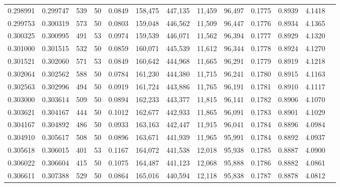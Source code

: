 \begin{tabular}{rrrrrrrrrrrrr}
0.298991 & 0.299747 &   539 &  50 &                                     0.0849 & 158,475 & 447,135 &  11,459 &  96,497 & 0.1775 & 0.8939 & 4.1418 \\
0.299753 & 0.300319 &   573 &  50 &                                     0.0803 & 159,048 & 446,562 &  11,509 &  96,447 & 0.1776 & 0.8934 & 4.1365 \\
0.300325 & 0.300995 &   491 &  53 &                                     0.0974 & 159,539 & 446,071 &  11,562 &  96,394 & 0.1777 & 0.8929 & 4.1320 \\
0.301000 & 0.301515 &   532 &  50 &                                     0.0859 & 160,071 & 445,539 &  11,612 &  96,344 & 0.1778 & 0.8924 & 4.1270 \\
0.301521 & 0.302060 &   571 &  53 &                                     0.0849 & 160,642 & 444,968 &  11,665 &  96,291 & 0.1779 & 0.8919 & 4.1218 \\
0.302064 & 0.302562 &   588 &  50 &                                     0.0784 & 161,230 & 444,380 &  11,715 &  96,241 & 0.1780 & 0.8915 & 4.1163 \\
0.302563 & 0.302996 &   494 &  50 &                                     0.0919 & 161,724 & 443,886 &  11,765 &  96,191 & 0.1781 & 0.8910 & 4.1117 \\
0.303000 & 0.303614 &   509 &  50 &                                     0.0894 & 162,233 & 443,377 &  11,815 &  96,141 & 0.1782 & 0.8906 & 4.1070 \\
0.303621 & 0.304167 &   444 &  50 &                                     0.1012 & 162,677 & 442,933 &  11,865 &  96,091 & 0.1783 & 0.8901 & 4.1029 \\
0.304167 & 0.304892 &   486 &  50 &                                     0.0933 & 163,163 & 442,447 &  11,915 &  96,041 & 0.1784 & 0.8896 & 4.0984 \\
0.304910 & 0.305617 &   508 &  50 &                                     0.0896 & 163,671 & 441,939 &  11,965 &  95,991 & 0.1784 & 0.8892 & 4.0937 \\
0.305618 & 0.306015 &   401 &  53 &                                     0.1167 & 164,072 & 441,538 &  12,018 &  95,938 & 0.1785 & 0.8887 & 4.0900 \\
0.306022 & 0.306604 &   415 &  50 &                                     0.1075 & 164,487 & 441,123 &  12,068 &  95,888 & 0.1786 & 0.8882 & 4.0861 \\
0.306611 & 0.307388 &   529 &  50 &                                     0.0864 & 165,016 & 440,594 &  12,118 &  95,838 & 0.1787 & 0.8878 & 4.0812 \\

\end{tabular}
